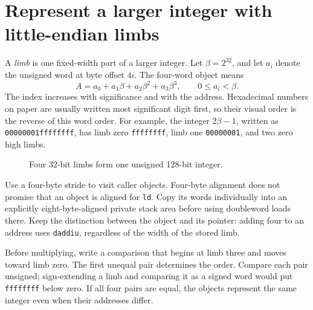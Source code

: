 \section{Represent a larger integer with little-endian limbs}
A \emph{limb} is one fixed-width part of a larger integer. Let \(\beta=2^{32}\), and
let \(a_i\) denote the unsigned word at byte offset \(4i\). The four-word object means
\[
  A=a_0+a_1\beta+a_2\beta^2+a_3\beta^3,\qquad 0\leq a_i<\beta.
\]
The index increases with significance and with the address. Hexadecimal numbers on
paper are usually written most significant digit first, so their visual order is the
reverse of this word order. For example, the integer \(2\beta-1\), written as
\texttt{00000001ffffffff}, has limb zero \texttt{ffffffff}, limb one
\texttt{00000001}, and two zero high limbs.

\begin{figure}[htbp]
  \centering
  \caption{Four 32-bit limbs form one unsigned 128-bit integer.}\label{rsa-limb-layout}
\end{figure}

Use a four-byte stride to visit caller objects. Four-byte alignment does not promise
that an object is aligned for \texttt{ld}. Copy its words individually into an
explicitly eight-byte-aligned private stack area before using doubleword loads there.
Keep the distinction between the object and its pointer: adding four to an address
uses \texttt{daddiu}, regardless of the width of the stored limb.

Before multiplying, write a comparison that begins at limb three and moves toward
limb zero. The first unequal pair determines the order. Compare each pair unsigned;
sign-extending a limb and comparing it as a signed word would put \texttt{ffffffff} below zero. If all four pairs are
equal, the objects represent the same integer even when their addresses differ.
